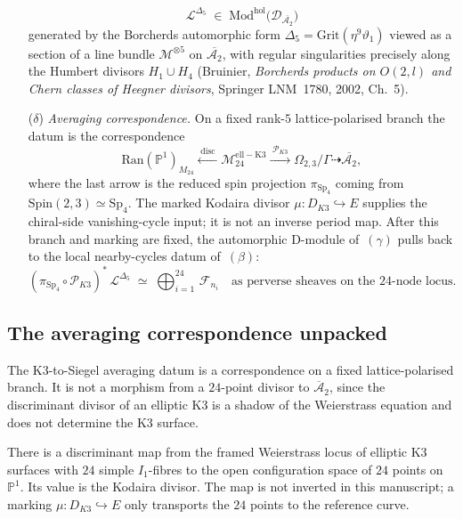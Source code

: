 \begin{definition}
\begin{enumerate}[label=\textup{($\alpha$--$\delta$)}, leftmargin=*]
 \[
 \mathcal{L}^{\Delta_5}
 \;\in\;
 \mathrm{Mod}^{\mathrm{hol}}\bigl(\mathcal{D}_{\overline{\mathcal{A}_2}}\bigr)
 \]
 generated by the Borcherds automorphic form $\Delta_5 = \mathrm{Grit}(\eta^9\vartheta_1)$ viewed as a section of a line bundle $\mathcal{M}^{\otimes 5}$ on $\overline{\mathcal{A}_2}$, with regular singularities precisely along the Humbert divisors $H_1\cup H_4$ (Bruinier, \emph{Borcherds products on $O(2,l)$ and Chern classes of Heegner divisors}, Springer LNM~1780, 2002, Ch.~5).
\item[\textup{($\delta$)} \emph{Averaging correspondence.}]
 On a fixed rank-\(5\) lattice-polarised branch the datum is the correspondence
 \[
 \mathrm{Ran}(\mathbb{P}^1)_{M_{24}}
 \xleftarrow{\;\mathrm{disc}\;}
 \mathcal{M}^{\mathrm{ell-K3}}_{24}
 \xrightarrow{\;\mathscr P_{K3}\;}
 \Omega_{2,3}/\Gamma
 \dashrightarrow
 \overline{\mathcal{A}_2},
 \]
 where the last arrow is the reduced spin projection
 \(\pi_{\mathrm{Sp}_4}\) coming from
 \(\mathrm{Spin}(2,3)\simeq \mathrm{Sp}_4\).  The marked Kodaira
 divisor \(\mu:D_{K3}\hookrightarrow E\) supplies the chiral-side
 vanishing-cycle input; it is not an inverse period map.  After this
 branch and marking are fixed, the automorphic D-module of~\((\gamma)\)
 pulls back to the local nearby-cycles datum of~\((\beta)\):
 \[
 (\pi_{\mathrm{Sp}_4}\circ\mathscr P_{K3})^*\,\mathcal{L}^{\Delta_5}
 \;\simeq\;
 \bigoplus_{i=1}^{24}\,\mathcal{F}_{n_i}
 \quad\text{as perverse sheaves on the $24$-node locus.}
 \]
\end{enumerate}
\end{definition}

\subsection{The averaging correspondence unpacked}
\label{subsec:averaging-morphism-unpacked}

The K3-to-Siegel averaging datum is a correspondence on a fixed lattice-polarised branch. It is not a morphism from a \(24\)-point divisor to \(\overline{\mathcal A}_2\), since the discriminant divisor of an elliptic K3 is a shadow of the Weierstrass equation and does not determine the K3 surface.

\begin{proposition}
\label{prop:kodaira-j-step-bcb}
There is a discriminant map from the framed Weierstrass locus of elliptic K3 surfaces with \(24\) simple \(I_1\)-fibres to the open configuration space of \(24\) points on \(\mathbb P^1\). Its value is the Kodaira divisor. The map is not inverted in this manuscript; a marking \(\mu:D_{K3}\hookrightarrow E\) only transports the \(24\) points to the reference curve.
\end{proposition}

